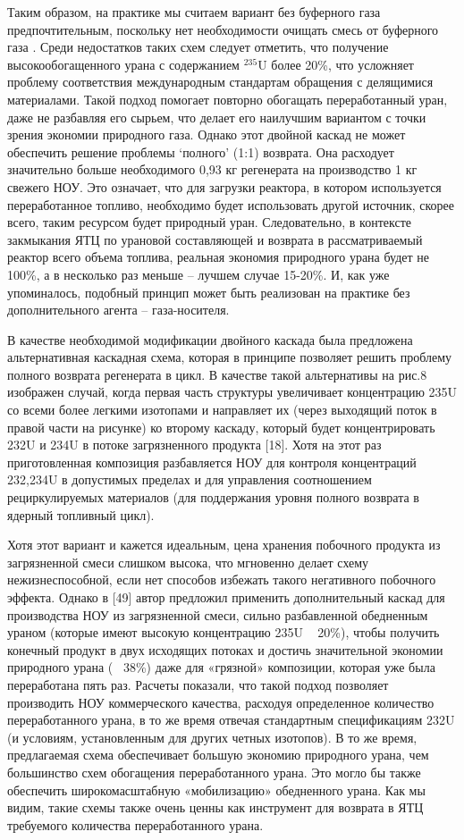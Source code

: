 Таким образом, на практике мы считаем вариант без буферного газа предпочтительным, поскольку нет необходимости очищать смесь от буферного газа \cite{smirnovKaskadnyeShemyZadachah2012}. Среди недостатков таких схем следует отметить, что получение высокообогащенного урана с содержанием $^{235}$U более 20\%, что усложняет проблему соответствия международным стандартам обращения с делящимися материалами.
Такой подход помогает повторно обогащать переработанный уран, даже не разбавляя его сырьем, что делает его наилучшим вариантом с точки зрения экономии природного газа. Однако этот двойной каскад не может обеспечить решение проблемы `полного' (1:1) возврата. Она расходует значительно больше необходимого 0,93 кг регенерата на производство 1 кг свежего НОУ. Это означает, что для загрузки реактора, в котором используется переработанное топливо, необходимо будет использовать другой источник, скорее всего, таким ресурсом будет природный уран. Следовательно, в контексте закмыкания ЯТЦ по урановой составляющей и возврата в рассматриваемый реактор всего объема топлива, реальная экономия природного урана будет не 100\%, а в несколько раз меньше -- лучшем случае 15-20\%. И, как уже упоминалось, подобный принцип может быть реализован на практике без дополнительного агента -- газа-носителя.

В качестве необходимой модификации двойного каскада была предложена альтернативная каскадная схема, которая в принципе позволяет решить проблему полного возврата регенерата в цикл. В качестве такой альтернативы на рис.8 изображен случай, когда первая часть структуры увеличивает концентрацию 235U со всеми более легкими изотопами и направляет их (через выходящий поток в правой части на рисунке) ко второму каскаду, который будет концентрировать 232U и 234U в потоке загрязненного продукта [18]. Хотя на этот раз приготовленная композиция разбавляется НОУ для контроля концентраций 232,234U в допустимых пределах и для управления соотношением рециркулируемых материалов (для поддержания уровня полного возврата в ядерный топливный цикл).

Хотя этот вариант и кажется идеальным, цена хранения побочного продукта из загрязненной смеси слишком высока, что мгновенно делает схему нежизнеспособной, если нет способов избежать такого негативного побочного эффекта.
Однако в [49] автор предложил применить дополнительный каскад для производства НОУ из загрязненной смеси, сильно разбавленной обедненным ураном (которые имеют высокую концентрацию 235U ~ 20\%), чтобы получить конечный продукт в двух исходящих потоках и достичь значительной экономии природного урана (~ 38\%) даже для «грязной» композиции, которая уже была переработана пять раз. Расчеты показали, что такой подход позволяет производить НОУ коммерческого качества, расходуя определенное количество переработанного урана, в то же время отвечая стандартным спецификациям 232U (и условиям, установленным для других четных изотопов). В то же время, предлагаемая схема обеспечивает большую экономию природного урана, чем большинство схем обогащения переработанного урана. Это могло бы также обеспечить широкомасштабную «мобилизацию» обедненного урана.
Как мы видим, такие схемы также очень ценны как инструмент для возврата в ЯТЦ требуемого количества переработанного урана.

